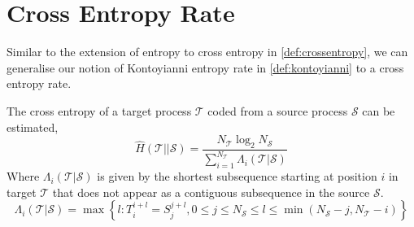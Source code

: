 \section{Cross Entropy Rate}

Similar to the extension of entropy to cross entropy in \autoref{def:crossentropy}, we can generalise our notion of Kontoyianni entropy rate in \autoref{def:kontoyianni} to a cross entropy rate.

\begin{definition}
	The cross entropy of a {\color{target} target process} $\mathcal{T}$ coded from a {\color{source} source process} $\mathcal{S}$ can be estimated,
	\begin{equation}
	\hat{H}(\mathcal{T} || \mathcal{S})=\frac{N_{\mathcal{T}} \log _{2} N_{\mathcal{S}}}{\sum_{i=1}^{N_{\mathcal{T}}} \Lambda_{i}(\mathcal{T}| \mathcal{S})}
	\end{equation}
	Where $\Lambda_{i}(\mathcal{T}| \mathcal{S})$ is given by the shortest subsequence starting at position $i$ in {\color{target}target} $\mathcal{T}$ that does not appear as a contiguous subsequence in the {\color{source}source} $\mathcal{S}$.
	\begin{equation}
	\Lambda_{i}(\mathcal{T}| \mathcal{S}) = \max \left\{l: T_i^{i+l}=S_{j}^{j+l}, 0 \leq j \leq N_{\mathcal{S}} \leq l \leq \min( N_{\mathcal{S}}- j , N_{\mathcal{T}}- i )\right\}
	\end{equation}
\end{definition}






